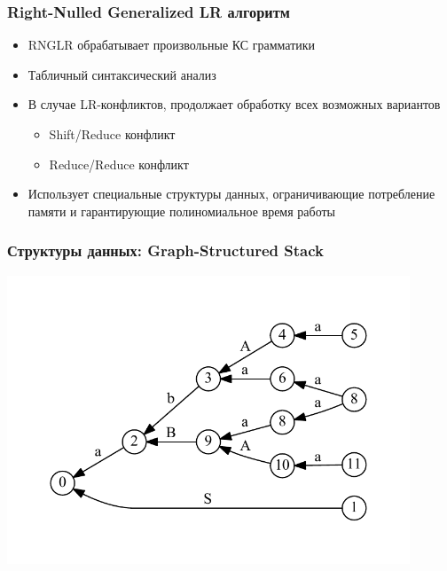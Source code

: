 \documentclass{beamer}
\begin{document}
\begin{frame}
  \transwipe[direction=90]
  \frametitle{Right-Nulled Generalized LR алгоритм}
  \begin{itemize}
    \item RNGLR обрабатывает произвольные КС грамматики
    \item Табличный синтаксический анализ 
    \item В случае LR-конфликтов, продолжает обработку всех возможных вариантов
    \begin{itemize}
      \item Shift/Reduce конфликт
      \item Reduce/Reduce конфликт
    \end{itemize}
    \item Использует специальные структуры данных, ограничивающие потребление 
памяти и гарантирующие полиномиальное время работы
  \end{itemize}
\end{frame}

\begin{frame}
  \transwipe[direction=90]
  \frametitle{Структуры данных: Graph-Structured Stack}
  \includegraphics[width=12cm]{pictures/gss_rnglr}
\end{frame}
\end{document}
